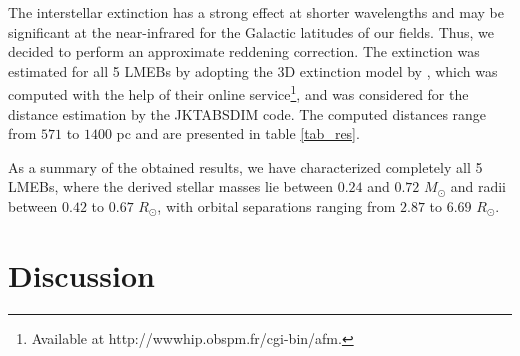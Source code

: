 \documentclass[fleqn,usenatbib]{mnras}
\begin{document}
%
%

The interstellar extinction has a strong effect at shorter wavelengths and may be significant at the near-infrared for the Galactic latitudes of our fields. Thus, we decided to perform an approximate reddening correction. 
The extinction was estimated for all 5 LMEBs by adopting the 3D extinction model by \citet{Arenou92}, which was computed with the help of their online service\footnote{Available at http://wwwhip.obspm.fr/cgi-bin/afm.}, and was considered for the distance estimation by the JKTABSDIM code. 
The computed distances range from $571$ to $1400$ pc and are presented in table \ref{tab_res}.

As a summary of the obtained results, we have characterized completely all 5 LMEBs, where the derived stellar masses lie between $0.24$ and $0.72$ $M_{\odot}$ and radii between $0.42$ to $0.67$ $R_{\odot}$, with orbital separations ranging from $2.87$ to $6.69$ $R_{\odot}$.



\section{Discussion}\label{discus}
\end{document}
